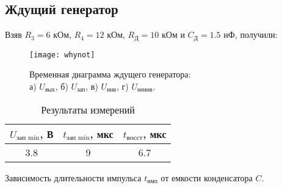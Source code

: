 \subsection{Ждущий генератор}

Взяв $R_3 = 6$ кОм, $R_4 = 12$ кОм, $R_\text{Д} = 10$ кОм и $C_\text{Д} = 1.5$ нФ, получили:

\begin{figure}[H]
\begin{center}
	\texttt{[image: whynot]}
	\captionsetup{margin=0cm}
	\caption{Временная диаграмма ждущего генератора:\\ а) $U_\text{вых}$, б) $U_\text{зап}$, в) $U_\text{инв}$, г) $U_\text{неинв}$.} 
	\label{fig:diff}
\end{center}
\end{figure}

\begin{table}[H]
\begin{center}
	\caption{Результаты измерений}
	\def\tabcolsep{10pt}
	\begin{tabular}{|c|c|c|}
		\hline
		$U_\text{зап\ min}$, В &
		$t_\text{зап\ min}$, мкс &
		$t_{\text{восст}}$, мкс \\
		\hline
		3.8 &
		9 &
		6.7 \\
	    \hline	
	\end{tabular}
\end{center}
\end{table}

\begin{table}[H]
\begin{center}
	\caption{Зависимость длительности импульса $t_\text{имп}$ от емкости конденсатора $C$.}
	\label{tab:limiter}
	\def\tabcolsep{20pt}
	\def\arraystretch{1.23}
	\fontsize{13}{14}\selectfont
\end{center}
\end{table}

\vspace{-1cm}

